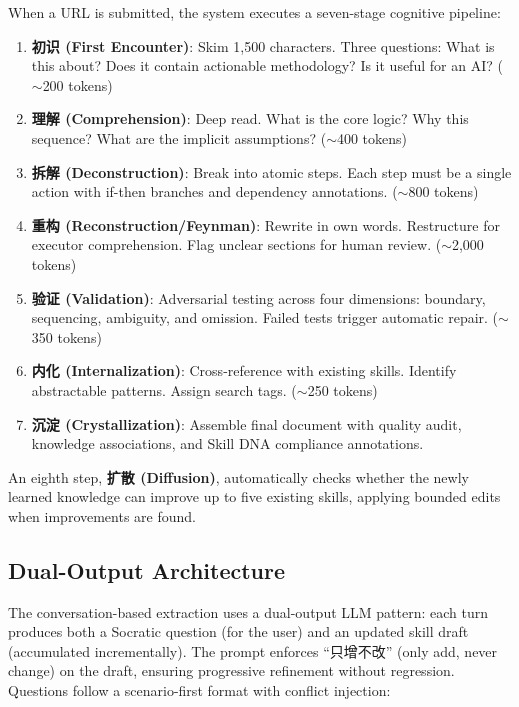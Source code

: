 \documentclass[11pt]{article}
\begin{document}
When a URL is submitted, the system executes a seven-stage cognitive pipeline:

\begin{enumerate}[leftmargin=*,nosep]
    \item \textbf{初识 (First Encounter)}: Skim 1,500 characters. Three questions: What is this about? Does it contain actionable methodology? Is it useful for an AI? ($\sim$200 tokens)
    \item \textbf{理解 (Comprehension)}: Deep read. What is the core logic? Why this sequence? What are the implicit assumptions? ($\sim$400 tokens)
    \item \textbf{拆解 (Deconstruction)}: Break into atomic steps. Each step must be a single action with if-then branches and dependency annotations. ($\sim$800 tokens)
    \item \textbf{重构 (Reconstruction/Feynman)}: Rewrite in own words. Restructure for executor comprehension. Flag unclear sections for human review. ($\sim$2,000 tokens)
    \item \textbf{验证 (Validation)}: Adversarial testing across four dimensions: boundary, sequencing, ambiguity, and omission. Failed tests trigger automatic repair. ($\sim$350 tokens)
    \item \textbf{内化 (Internalization)}: Cross-reference with existing skills. Identify abstractable patterns. Assign search tags. ($\sim$250 tokens)
    \item \textbf{沉淀 (Crystallization)}: Assemble final document with quality audit, knowledge associations, and Skill DNA compliance annotations.
\end{enumerate}

An eighth step, \textbf{扩散 (Diffusion)}, automatically checks whether the newly learned knowledge can improve up to five existing skills, applying bounded edits when improvements are found.

\subsection{Dual-Output Architecture}

The conversation-based extraction uses a dual-output LLM pattern: each turn produces both a Socratic question (for the user) and an updated skill draft (accumulated incrementally). The prompt enforces ``只增不改'' (only add, never change) on the draft, ensuring progressive refinement without regression. Questions follow a scenario-first format with conflict injection:
\end{document}
